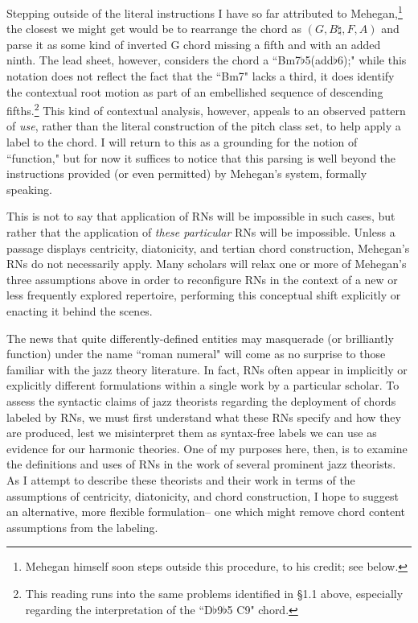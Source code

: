 Stepping outside of the literal instructions I have so far attributed to Mehegan,\footnote{Mehegan himself soon steps outside this procedure, to his credit; see below.} the closest we might get would be to rearrange the chord as $(G, B\natural, F, A)$ and parse it as some kind of inverted G chord missing a fifth and with an added ninth.  The lead sheet, however, considers the chord a ``Bm7$\flat$5(add$\flat$6);" while this notation does not reflect the fact that the ``Bm7" lacks a third, it does identify the contextual root motion as part of an embellished sequence of descending fifths.\footnote{This reading runs into the same problems identified in \S 1.1 above, especially regarding the interpretation of the ``D$\flat$9$\flat$5 C9" chord.}  This kind of contextual analysis, however, appeals to an observed pattern of \emph{use}, rather than the literal construction of the pitch class set, to help apply a label to the chord.  I will return to this as a grounding for the notion of ``function," but for now it suffices to notice that this parsing is well beyond the instructions provided (or even permitted) by Mehegan's system, formally speaking.

This is not to say that application of RNs will be impossible in such cases, but rather that the application of \emph{these particular} RNs will be impossible.  Unless a passage displays centricity, diatonicity, and tertian chord construction, Mehegan's RNs do not necessarily apply.  Many scholars will relax one or more of Mehegan's three assumptions above in order to reconfigure RNs in the context of a new or less frequently explored repertoire, performing this conceptual shift explicitly or enacting it behind the scenes.

The news that quite differently-defined entities may masquerade (or brilliantly function) under the name ``roman numeral" will come as no surprise to those familiar with the jazz theory literature.  In fact, RNs often appear in implicitly or explicitly different formulations within a single work by a particular scholar.  To assess the syntactic claims of jazz theorists regarding the deployment of chords labeled by RNs, we must first understand what these RNs specify and how they are produced, lest we misinterpret them as syntax-free labels we can use as evidence for our harmonic theories.  One of my purposes here, then, is to examine the definitions and uses of RNs in the work of several prominent jazz theorists.  As I attempt to describe these theorists and their work in terms of the assumptions of centricity, diatonicity, and chord construction, I hope to suggest an alternative, more flexible formulation-- one which might remove chord content assumptions from the labeling.

